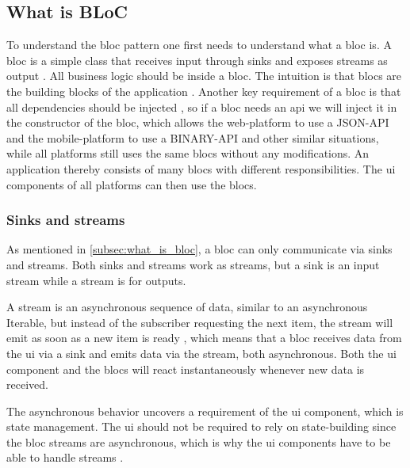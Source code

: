 \subsection{What is BLoC} \label{subsec:what_is_bloc}

To understand the \gls{bloc} pattern one first needs to understand what a \gls{bloc} is. A \gls{bloc} is a simple class that receives input through sinks and exposes streams as output \cite[21 min 25 sec]{blocPattern}. All business logic should be inside a \gls{bloc}. The intuition is that \glspl{bloc} are the building blocks of the application \cite[21 min 25 sec]{blocPattern}. Another key requirement of a \gls{bloc} is that all dependencies should be injected \cite[22 min 55 sec]{blocPattern}, so if a \gls{bloc} needs an \gls{api} we will inject it in the constructor of the \gls{bloc}, which allows the web-platform to use a JSON-API and the mobile-platform to use a BINARY-API and other similar situations, while all platforms still uses the same \glspl{bloc} without any modifications. An application thereby consists of many \glspl{bloc} with different responsibilities. The \gls{ui} components of all platforms can then use the \glspl{bloc}.

\subsubsection{Sinks and streams}

As mentioned in \autoref{subsec:what_is_bloc}, a \gls{bloc} can only communicate via sinks and streams. Both sinks and streams work as streams, but a sink is an input stream while a stream is for outputs.

A stream is an asynchronous sequence of data, similar to an asynchronous Iterable, but instead of the subscriber requesting the next item, the stream will emit as soon as a new item is ready \cite{dartStreams}, which means that a \gls{bloc} receives data from the \gls{ui} via a sink and emits data via the stream, both asynchronous. Both the \gls{ui} component and the \glspl{bloc} will react instantaneously whenever new data is received.

The asynchronous behavior uncovers a requirement of the \gls{ui} component, which is state management. The \gls{ui} should not be required to rely on state-building since the \gls{bloc} streams are asynchronous, which is why the \gls{ui} components have to be able to handle streams \cite[4 min 40 sec]{blocPattern}\cite[14min 00 sec]{blocPattern}.

